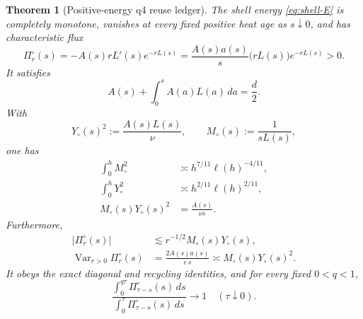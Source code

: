 \documentclass[11pt]{article}
\newtheorem{theorem}{Theorem}
\theoremstyle{remark}
\newcommand{\Var}{\operatorname{Var}}
\begin{document}
\begin{theorem}[Positive-energy q4 reuse ledger]
\label{thm:shell}
The shell energy \eqref{eq:shell-E} is completely monotone, vanishes at
every fixed positive heat age as \(s\downarrow0\), and has characteristic
flux
\begin{equation}
\label{eq:shell-Pi}
 \boxed{
 \Pi^\circ_r(s)
 =
 -A(s)rL'(s)e^{-rL(s)}
 =
 \frac{A(s)a(s)}s
 \bigl(rL(s)\bigr)e^{-rL(s)}>0.
 }
\end{equation}
It satisfies
\begin{equation}
\label{eq:shell-energy}
 A(s)+\int_0^sA(a)L(a)\,da=\frac d2.
\end{equation}
With
\begin{equation}
\label{eq:shell-MY}
 Y_\circ(s)^2:=\frac{A(s)L(s)}{\nu},
 \qquad
 M_\circ(s):=\frac1{sL(s)},
\end{equation}
one has
\begin{align}
\label{eq:M-tail}
 \int_0^hM_\circ^2
 &\asymp h^{7/11}\ell(h)^{-4/11},\\
\label{eq:Y-tail}
 \int_0^hY_\circ^2
 &\asymp h^{2/11}\ell(h)^{2/11},\\
\label{eq:MY2}
 M_\circ(s)Y_\circ(s)^2
 &=\frac{A(s)}{\nu s}.
\end{align}
Furthermore,
\begin{align}
\label{eq:shell-bound}
 |\Pi^\circ_r(s)|
 &\lesssim r^{-1/2}M_\circ(s)Y_\circ(s),\\
\label{eq:shell-var}
 \Var_{r>0}\Pi^\circ_r(s)
 &=\frac{2A(s)a(s)}{e\,s}
 \asymp M_\circ(s)Y_\circ(s)^2.
\end{align}
It obeys the exact diagonal and recycling identities, and for every fixed
\(0<q<1\),
\begin{equation}
\label{eq:early}
 \boxed{
 \frac{\displaystyle
 \int_0^{q\tau}\Pi^\circ_{\tau-s}(s)\,ds}
 {\displaystyle
 \int_0^\tau\Pi^\circ_{\tau-s}(s)\,ds}
 \longrightarrow1
 \quad(\tau\downarrow0).
 }
\end{equation}
\end{theorem}
\end{document}
